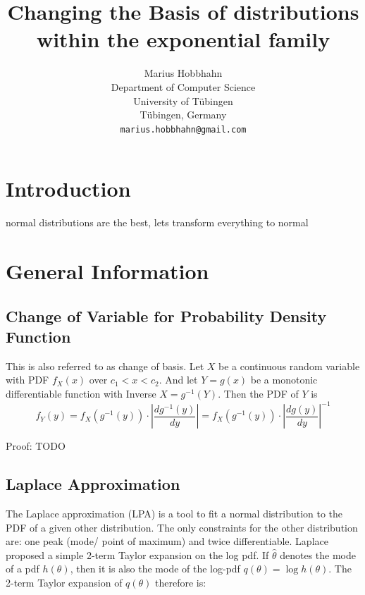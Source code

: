 \documentclass{article}
\title{Changing the Basis of distributions within the exponential family}
\author{%
  Marius Hobbhahn \\
  Department of Computer Science\\
  University of Tübingen\\
  Tübingen, Germany \\
  \texttt{marius.hobbhahn@gmail.com} \\
}
\begin{document}
\maketitle

\section{Introduction}

normal distributions are the best, lets transform everything to normal

\section{General Information}

\subsection{Change of Variable for Probability Density Function}
\label{subsec:variable_change_pdf}

This is also referred to as change of basis. Let $X$ be a continuous random variable with PDF $f_X(x)$ over $c_1 < x < c_2$. And let $Y = g(x)$ be a monotonic differentiable function with Inverse $X = g^{-1}(Y)$. Then the PDF of $Y$ is
$$f_Y(y) = f_X(g^{-1}(y)) \cdot \left | \frac{d g^{-1}(y)}{dy} \right| 
= f_X(g^{-1}(y)) \cdot \left | \frac{d g(y)}{dy} \right|^{-1} $$

Proof: TODO

\subsection{Laplace Approximation}

The Laplace approximation (LPA) is a tool to fit a normal distribution to the PDF of a given other distribution. The only constraints for the other distribution are: one peak (mode/ point of maximum) and twice differentiable. Laplace proposed a simple 2-term Taylor expansion on the log pdf. If $\hat{\theta}$ denotes the mode of a pdf $h(\theta)$, then it is also the mode of the log-pdf $q(\theta) = \log h(\theta)$. The 2-term Taylor expansion of $q(\theta)$ therefore is:
\end{document}
